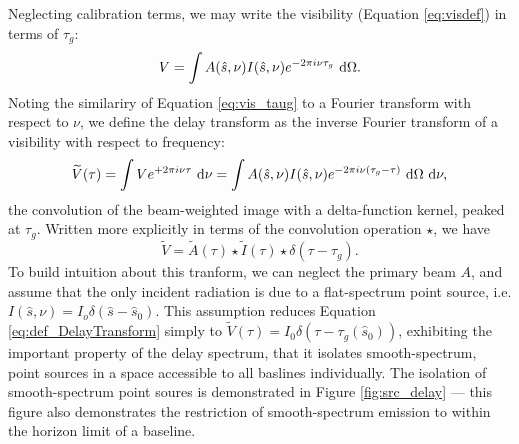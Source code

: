 Neglecting calibration terms, we may write the visibility (Equation \ref{eq:visdef}) in terms of
$\tau_g$:
\begin{equation}
   V = \int A(\hat{s},\nu)I(\hat{s},\nu)e^{-2\pi i \nu\tau_g}\ \mathrm{d}\Omega.
  \label{eq:vis_taug}  
\end{equation}
Noting the similariry of Equation \ref{eq:vis_taug} to a Fourier transform with respect to $\nu$, we
define the delay transform as the inverse Fourier transform of a visibility with respect to
frequency:
\begin{equation}
  \widetilde{V}(\tau) = \int V e^{+2\pi i\nu\tau}\ \mathrm{d}\nu
    = \int A(\hat{s},\nu)I(\hat{s},\nu)e^{-2\pi i \nu(\tau_g-\tau)}\ \mathrm{d}\Omega\ \mathrm{d}\nu,
  \label{eq:def_DelayTransform}
\end{equation}
the convolution of the beam-weighted image with a delta-function kernel, peaked at $\tau_g$. Written
more explicitly in terms of the convolution operation $\star$, we have 
\begin{equation}
  \widetilde{V} = \widetilde{A}(\tau) \star \widetilde{I}(\tau) \star \delta\left(\tau-\tau_g\right).
\end{equation}
To build intuition about this tranform, we can neglect the primary beam $A$, and assume that the
only incident radiation is due to a flat-spectrum point source, i.e. 
$I(\hat{s},\nu) = I_o\delta(\hat{s}-\hat{s}_0).$ This assumption reduces Equation
\ref{eq:def_DelayTransform} simply to $\widetilde{V}(\tau) = I_0\delta(\tau-\tau_g(\hat{s}_0))$, exhibiting
the important property of the delay spectrum, that it isolates smooth-spectrum, point sources in a
space accessible to all baslines individually. The isolation of smooth-spectrum point soures is
demonstrated in Figure \ref{fig:src_delay} --- this figure also demonstrates the restriction of
smooth-spectrum emission to within the horizon limit of a baseline.


